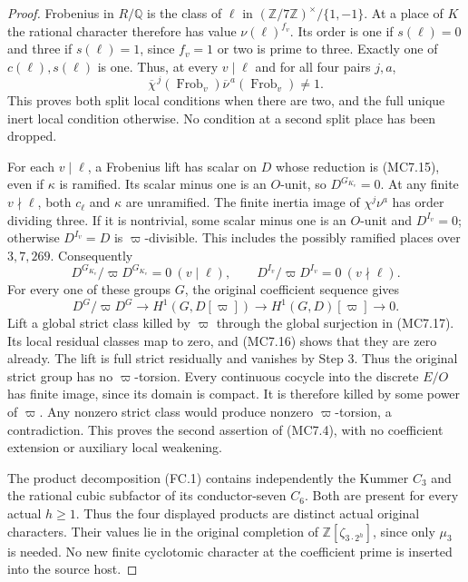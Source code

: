\begin{proof}
Frobenius in $R/\mathbb Q$ is the class of $\ell$ in
$(\mathbb Z/7\mathbb Z)^\times/\{1,-1\}$.
At a place of $K$ the rational character therefore has value
$\nu(\ell)^{f_v}$.  Its order is one if $s(\ell)=0$ and
three if $s(\ell)=1$, since $f_v=1$ or two is prime to three.
Exactly one of $c(\ell),s(\ell)$ is one.  Thus, at every
$v\mid\ell$ and for all four pairs $j,a$,
\[
 \overline\chi^{\,j}(\operatorname{Frob}_v)
       \overline\nu^{\,a}(\operatorname{Frob}_v)\ne1.
 \tag{MC7.15}
\]
This proves both split local conditions when there are two,
and the full unique inert local condition otherwise.
No condition at a second split place has been dropped.

For each $v\mid\ell$, a Frobenius lift has scalar on $D$
whose reduction is (MC7.15), even if $\kappa$ is ramified.
Its scalar minus one is an $O$-unit, so $D^{G_{K_v}}=0$.
At any finite $v\nmid\ell$, both $c_\ell$ and $\kappa$
are unramified.  The finite inertia image of $\chi^j\nu^a$
has order dividing three.  If it is nontrivial, some scalar
minus one is an $O$-unit and $D^{I_v}=0$; otherwise
$D^{I_v}=D$ is $\varpi$-divisible.  This includes the
possibly ramified places over $3,7,269$.  Consequently
\[
 D^{G_{K_v}}/\varpi D^{G_{K_v}}=0\ (v\mid\ell),
 \qquad D^{I_v}/\varpi D^{I_v}=0\ (v\nmid\ell).
 \tag{MC7.16}
\]
For every one of these groups $G$, the original coefficient
sequence gives
\[
 D^G/\varpi D^G\longrightarrow H^1(G,D[\varpi])
            \longrightarrow H^1(G,D)[\varpi]\longrightarrow0.
 \tag{MC7.17}
\]
Lift a global strict class killed by $\varpi$ through the
global surjection in (MC7.17).  Its local residual classes
map to zero, and (MC7.16) shows that they are zero already.
The lift is full strict residually and vanishes by Step 3.
Thus the original strict group has no $\varpi$-torsion.
Every continuous cocycle into the discrete $E/O$ has finite
image, since its domain is compact.  It is therefore killed
by some power of $\varpi$.  Any nonzero strict class would
produce nonzero $\varpi$-torsion, a contradiction.  This
proves the second assertion of (MC7.4), with no coefficient
extension or auxiliary local weakening.

The product decomposition (FC.1) contains independently the
Kummer $C_3$ and the rational cubic subfactor of its conductor-seven
$C_6$.  Both are present for every actual $h\geq1$.
Thus the four displayed products are distinct actual original
characters.  Their values lie in the original completion of
$\mathbb Z[\zeta_{3\cdot2^h}]$, since only $\mu_3$ is needed.
No new finite cyclotomic character at the coefficient prime is
inserted into the source host.


\end{proof}
